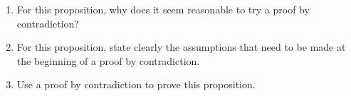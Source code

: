 \begin{enumerate}
\begin{enumerate}
  \item For this proposition, why does it seem reasonable to try a proof by contradiction?

  \item For this proposition, state clearly the assumptions that need to be made at the beginning of a proof by contradiction.

  \item Use a proof by contradiction to prove this proposition.
\end{enumerate}
\end{enumerate}

\hbreak

\endinput
